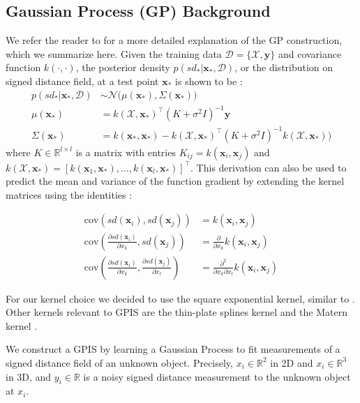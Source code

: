 \documentclass[letterpaper, 10 pt, conference]{ieeeconf}  %
\newcommand{\by}{\mathbf{y}}
\newcommand{\bx}{\mathbf{x}}
\newcommand{\mX}{\mathcal{X}}
\newcommand{\mD}{\mathcal{D}}
\newcommand{\mN}{\mathcal{N}}
\begin{document}
\subsection{Gaussian Process (GP) Background}\label{sec:GP}
We refer the reader to \cite{mahler2015opt} for a more detailed explanation of the GP construction, which we summarize here.  Given the training data $\mD = \{\mX, \by\}$ and covariance function $k(\cdot,\cdot)$, the posterior density $p(sd_*|\bx_*,\mD)$, or the distribution on signed distance field, at a test point $\bx_{*}$ is shown to be \cite{rasmussen2010gaussian}:
\begin{align*}
	p(sd_*|\bx_*,\mD) &\sim \mN\big(\mu(\bx_*), \Sigma(\bx_*)\big) \\
	\mu(\bx_*) &= k(\mX,\bx_*)^{\intercal}(K + \sigma^2I)^{-1}\by \\
	\Sigma(\bx_*) &= k(\bx_*,\bx_*)-k(\mX,\bx_*)^{\intercal}(K+\sigma^2I)^{-1}k(\mX,\bx_*)\big) 
\end{align*}
where $K \in \mathbb{R}^{l \times l}$ is a matrix with entries $K_{ij} = k(\bx_i,\bx_j)$ and $k(\mX,\bx_*) = [k(\bx_1,\bx_*),\ldots,k(\bx_l,\bx_*)]^{\intercal}$. 
This derivation can also be used to predict the mean and variance of the function gradient by extending the kernel matrices using the identities \cite{solak2003derivative}:

\vspace{-2ex}
\begin{align}
	\text{cov}\left(sd(\bx_i), sd(\bx_j) \right) &=  k(\bx_i, \bx_j) \\
	\text{cov}\left(\frac{\partial sd (\bx_i)}{\partial x_k}, sd(\bx_j) \right) &= \frac{\partial}{\partial x_k} k(\bx_i, \bx_j) \label{eq:mean_gradient}\\
	\text{cov}\left(\frac{\partial sd (\bx_i)}{\partial x_k}, \frac{\partial sd (\bx_j)}{\partial x_l} \right) &= \frac{\partial^2}{\partial x_k \partial x_l} k(\bx_i, \bx_j)\label{eq:cov_gradient}
\end{align}


For our kernel choice we decided to use the square exponential kernel, similar to \cite{dragiev2011}. Other kernels relevant to GPIS are the thin-plate splines kernel and the Matern kernel \cite{williams2007}. 


We construct a GPIS by learning a Gaussian Process to fit measurements of a signed distance field of an unknown object.  Precisely, $x_i \in \mathbb{R}^2$ in 2D and $x_i \in \mathbb{R}^3$ in 3D, and $y_i \in \mathbb{R}$ is a noisy signed distance measurement to the unknown object at $x_i$.
\end{document}
